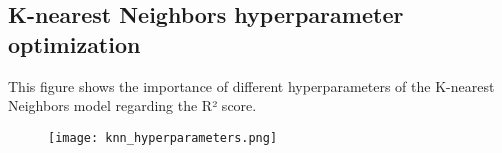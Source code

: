 \begin{appendices}
    
\chapter{K-nearest Neighbors hyperparameter optimization}\label{appendix:knn_parameters}
This figure shows the importance of different hyperparameters of the K-nearest Neighbors model regarding the R² score.


\begin{figure}[h]
    \texttt{[image: knn\_hyperparameters.png]}
\end{figure}

\end{appendices}